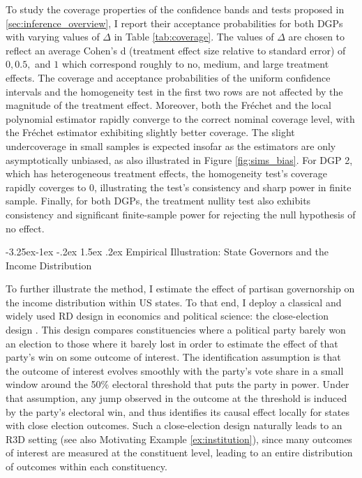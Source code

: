 \documentclass[12pt]{article}
\makeatletter
\renewcommand\subsection{\@startsection{subsection}{2}{\z@}%
  {-3.25ex\@plus -1ex \@minus -.2ex}%
  {1.5ex \@plus .2ex}%
  {\itshape\large\center}} %
\makeatother
\begin{document}
To study the coverage properties of the confidence bands and tests proposed in \ref{sec:inference_overview}, I report their acceptance probabilities for both DGPs with varying values of $\Delta$ in Table \ref{tab:coverage}. The values of $\Delta$ are chosen to reflect an average Cohen's d (treatment effect size relative to standard error) of $0, 0.5,$ and $1$ which correspond roughly to no, medium, and large treatment effects. The coverage and acceptance probabilities of the uniform confidence intervals and the homogeneity test in the first two rows are not affected by the magnitude of the treatment effect. Moreover, both the Fr\'echet and the local polynomial estimator rapidly converge to the correct nominal coverage level, with the Fr\'echet estimator exhibiting slightly better coverage. The slight undercoverage in small samples is expected insofar as the estimators are only asymptotically unbiased, as also illustrated in Figure \ref{fig:sims_bias}. For DGP 2, which has heterogeneous treatment effects, the homogeneity test's coverage rapidly coverges to 0, illustrating the test's consistency and sharp power in finite sample. Finally, for both DGPs, the treatment nullity test also exhibits consistency and significant finite-sample power for rejecting the null hypothesis of no effect. 


\subsection{Empirical Illustration: State Governors and the Income Distribution}

To further illustrate the method, I estimate the effect of partisan governorship on the income distribution within US states. To that end, I deploy a classical and widely used RD design in economics and political science: the close-election design \citep{lee2008randomized}. This design compares constituencies where a political party barely won an election to those where it barely lost in order to estimate the effect of that party's win on some outcome of interest. The identification assumption is that the outcome of interest evolves smoothly with the party's vote share in a small window around the 50\% electoral threshold that puts the party in power. Under that assumption, any jump observed in the outcome at the threshold is induced by the party's electoral win, and thus identifies its causal effect locally for states with close election outcomes. Such a close-election design naturally leads to an R3D setting (see also Motivating Example \ref{ex:institution}), since many outcomes of interest are measured at the constituent level, leading to an entire distribution of outcomes within each constituency. 
\end{document}
